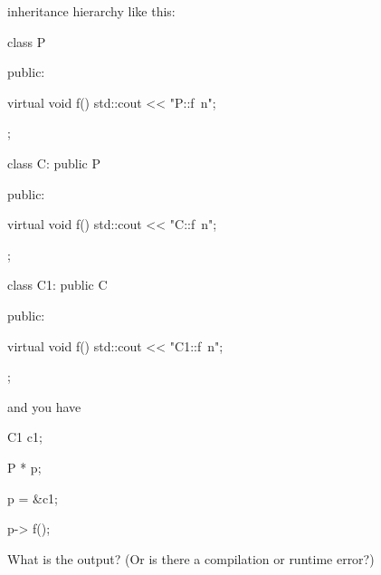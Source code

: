 
inheritance hierarchy like this:



\begin{console}

class P

{

public:

     virtual void f() { std::cout << "P::f\ n"; }

};



class C: public P

{

public:

     virtual void f() { std::cout << "C::f\ n"; }

};



class C1: public C

{

public:

     virtual void f() { std::cout << "C1::f\ n"; }

};

\end{console}



and you have



\begin{console}

C1 c1;

P * p;

p = &c1;

p-> f();

\end{console}



What is the output? (Or is there a compilation or runtime error?)

